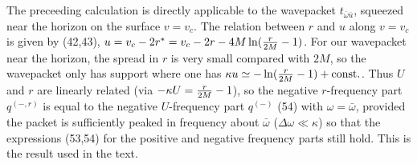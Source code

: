 \documentclass[12pt]{article}
\def\o{\omega}
\def\obar{\bar{\omega}}
\def\ubar{\bar{u}}
\begin{document}
The preceeding calculation is directly applicable to the
wavepacket $t_{\obar\ubar}$, squeezed near the horizon on
the surface $v=v_c$.
The relation between $r$ and $u$ along $v=v_c$ is given by
(42,43), $u=v_c-2r^*=v_c-2r-4M\ln({r\over2M}-1)$. For our
wavepacket near the horizon, the spread in $r$ is very small
compared with $2M$, so the wavepacket only has support where
one has $\kappa u\simeq-\ln({r\over 2M}-1)+{\rm const.}$.
Thus $U$ and $r$ are linearly related
(via $-\kappa U={r\over 2M}-1$), so the negative $r$-frequency
part $q^{\scriptscriptstyle(-,r)}$ is equal to the negative
$U$-frequency part $q^{\scriptscriptstyle(-)}$ (54) with
$\o=\obar$, provided the packet is sufficiently peaked in
frequency about $\obar$ ($\Delta\o\ll\kappa$) so that the
expressions (53,54) for the positive and negative frequency
parts still hold.
This is the result used in the text.
\end{document}
